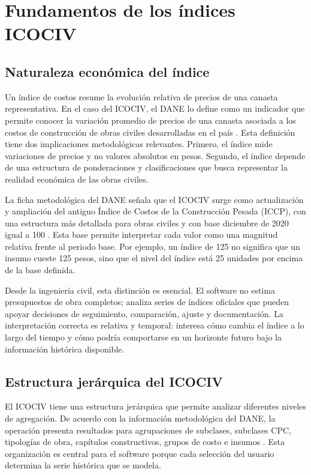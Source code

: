 \section{Fundamentos de los índices ICOCIV}

\subsection{Naturaleza económica del índice}

Un índice de costos resume la evolución relativa de precios de una canasta representativa. En el caso del ICOCIV, el DANE lo define como un indicador que permite conocer la variación promedio de precios de una canasta asociada a los costos de construcción de obras civiles desarrolladas en el país \parencite{dane_icociv_web}. Esta definición tiene dos implicaciones metodológicas relevantes. Primero, el índice mide variaciones de precios y no valores absolutos en pesos. Segundo, el índice depende de una estructura de ponderaciones y clasificaciones que busca representar la realidad económica de las obras civiles.

La ficha metodológica del DANE señala que el ICOCIV surge como actualización y ampliación del antiguo Índice de Costos de la Construcción Pesada (ICCP), con una estructura más detallada para obras civiles y con base diciembre de 2020 igual a 100 \parencite{dane_ficha_icociv}. Esta base permite interpretar cada valor como una magnitud relativa frente al periodo base. Por ejemplo, un índice de 125 no significa que un insumo cueste 125 pesos, sino que el nivel del índice está 25 unidades por encima de la base definida.

Desde la ingeniería civil, esta distinción es esencial. El software no estima presupuestos de obra completos; analiza series de índices oficiales que pueden apoyar decisiones de seguimiento, comparación, ajuste y documentación. La interpretación correcta es relativa y temporal: interesa cómo cambia el índice a lo largo del tiempo y cómo podría comportarse en un horizonte futuro bajo la información histórica disponible.

\subsection{Estructura jerárquica del ICOCIV}

El ICOCIV tiene una estructura jerárquica que permite analizar diferentes niveles de agregación. De acuerdo con la información metodológica del DANE, la operación presenta resultados para agrupaciones de subclases, subclases CPC, tipologías de obra, capítulos constructivos, grupos de costo e insumos \parencite{dane_ficha_icociv}. Esta organización es central para el software porque cada selección del usuario determina la serie histórica que se modela.

